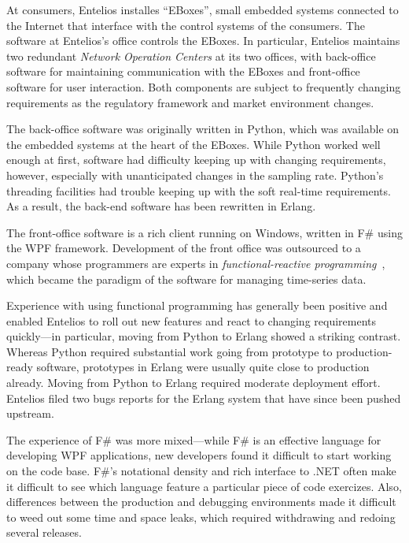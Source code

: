 \documentclass{jfp1}
\begin{document}
At consumers, Entelios installes ``EBoxes'', small embedded systems
connected to the Internet that interface with the control systems of
the consumers.  The software at Entelios's office controls the EBoxes.
In particular, Entelios maintains two redundant \textit{Network
  Operation Centers} at its two offices, with back-office software for
maintaining communication with the EBoxes and front-office software
for user interaction.  Both components are subject to frequently
changing requirements as the regulatory framework and market
environment changes.

The back-office software was originally written in Python, which was
available on the embedded systems at the heart of the EBoxes.  While
Python worked well enough at first, software had difficulty keeping up
with changing requirements, however, especially with unanticipated
changes in the sampling rate.  Python's threading facilities had
trouble keeping up with the soft real-time requirements.  As a result,
the back-end software has been rewritten in Erlang.

The front-office software is a rich client running on Windows, written
in F\# using the WPF framework.  Development of the front office was
outsourced to a company whose programmers are experts in \textit{functional-reactive
  programming}~\cite{Elliott:2009:PFR:1596638.1596643}, which became
the paradigm of the software for managing time-series data.

Experience with using functional programming has generally been
positive and enabled Entelios to roll out new features and react to
changing requirements quickly---in particular, moving from Python to
Erlang showed a striking contrast.  Whereas Python required substantial
work going from prototype to production-ready software, prototypes in
Erlang were usually quite close to production already.  Moving from
Python to Erlang required moderate deployment effort.  Entelios filed
two bugs reports for the Erlang system that have since been pushed upstream.

The experience of F\# was more mixed---while F\# is an effective
language for developing WPF applications, new developers found it
difficult to start working on the code base.  F\#'s notational density
and rich interface to .NET often make it difficult to see which
language feature a particular piece of code exercizes.  Also,
differences between the production and debugging environments made it
difficult to weed out some time and space leaks, which required
withdrawing and redoing several releases.
\end{document}
